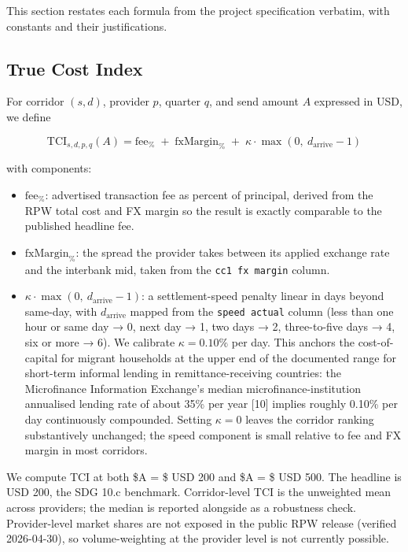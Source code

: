 \documentclass[
  11pt,
]{article}
\providecommand{\tightlist}{%
  \setlength{\itemsep}{0pt}\setlength{\parskip}{0pt}}
\begin{document}
This section restates each formula from the project specification
verbatim, with constants and their justifications.

\subsection{True Cost Index}\label{true-cost-index}

For corridor \((s, d)\), provider \(p\), quarter \(q\), and send amount
\(A\) expressed in USD, we define

\begin{equation}
\text{TCI}_{s,d,p,q}(A) = \mathrm{fee}_\% \;+\; \mathrm{fxMargin}_\% \;+\; \kappa \cdot \max(0,\ d_\text{arrive} - 1)
\label{eq:tci}
\end{equation}

with components:

\begin{itemize}
\tightlist
\item
  \(\mathrm{fee}_\%\): advertised transaction fee as percent of
  principal, derived from the RPW total cost and FX margin so the result
  is exactly comparable to the published headline fee.
\item
  \(\mathrm{fxMargin}_\%\): the spread the provider takes between its
  applied exchange rate and the interbank mid, taken from the
  \texttt{cc1\ fx\ margin} column.
\item
  \(\kappa \cdot \max(0,\ d_\text{arrive} - 1)\): a settlement-speed
  penalty linear in days beyond same-day, with \(d_\text{arrive}\)
  mapped from the \texttt{speed\ actual} column (less than one hour or
  same day → 0, next day → 1, two days → 2, three-to-five days → 4, six
  or more → 6). We calibrate \(\kappa = 0.10\%\) per day. This anchors
  the cost-of- capital for migrant households at the upper end of the
  documented range for short-term informal lending in
  remittance-receiving countries: the Microfinance Information
  Exchange's median microfinance-institution annualised lending rate of
  about 35\% per year {[}10{]} implies roughly 0.10\% per day
  continuously compounded. Setting \(\kappa = 0\) leaves the corridor
  ranking substantively unchanged; the speed component is small relative
  to fee and FX margin in most corridors.
\end{itemize}

We compute TCI at both \$A = \$ USD 200 and \$A = \$ USD 500. The
headline is USD 200, the SDG 10.c benchmark. Corridor-level TCI is the
unweighted mean across providers; the median is reported alongside as a
robustness check. Provider-level market shares are not exposed in the
public RPW release (verified 2026-04-30), so volume-weighting at the
provider level is not currently possible.
\end{document}
